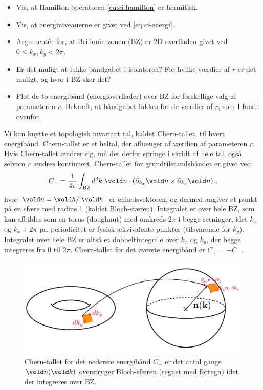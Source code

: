 \documentclass[11pt, a4paper]{article}
\let\v\vold
\newcommand{\v}[1]{{\bf{#1}}}
\begin{document}
\begin{itemize}
\item Vis, at Hamilton-operatoren \eqref{eq:ci-hamilton} er hermitisk.
\item Vis, at energiniveauerne er givet ved \eqref{eq:ci-energi}.
\item Argumentér for, at Brillouin-zonen (BZ) er 2D-overfladen givet ved
  $0 \leq k_x, k_y < 2\pi$.
\item Er det muligt at lukke båndgabet i isolatoren? For hvilke
  værdier af $r$ er det muligt, og hvor i BZ sker det?
\item Plot de to energibånd (energioverflader) over BZ for forskellige
  valg af parameteren $r$. Bekræft, at båndgabet lukkes for de værdier
  af $r$, som I fandt ovenfor.
\end{itemize}

Vi kan knytte et topologisk invariant tal, kaldet Chern-tallet, til
hvert energibånd. Chern-tallet er et heltal, der afhænger af værdien
af parameteren $r$. Hvis Chern-tallet ændrer sig, må det derfor
springe i skridt af hele tal, også selvom $r$ ændres
kontinuert. Chern-tallet for grundtilstandsbåndet er givet ved:
\begin{equation}
  \label{eq:cherntal}
  C_- = \frac{1}{4\pi} \int_\text{BZ} d^2 k \;
  \v n \cdot (\partial_{k_x} \v n \times \partial_{k_y} \v n) \; ,
\end{equation}
hvor $\v n = \v h / |\v h|$ er enhedsvektoren, og dermed angiver et
punkt på en sfære med radius 1 (kaldet Bloch-sfæren). Integralet er
over hele BZ, som kan afbildes som en torus (doughnut) med omkreds
$2\pi$ i begge retninger, idet $k_x$ og $k_x + 2\pi$ pr. periodicitet
er fysisk ækvivalente punkter (tilsvarende for $k_y$). Integralet over
hele BZ er altså et dobbeltintegrale over $k_x$ og $k_y$, der begge
integreres fra $0$ til $2\pi$. Chern-tallet for det øverste energibånd
er $C_+ = - C_-$.

\begin{figure}[htbp]
  \centering
  \includegraphics[width=.8\textwidth]{TorustoSpheFigCut}
  \caption{Chern-tallet for det nederste energibånd $C_-$ er det antal
    gange $\v n (\v k)$ overstryger Bloch-sfæren (regnet med fortegn)
    idet der integreres over BZ.}
  \label{fig:mapping}
\end{figure}
\end{document}

